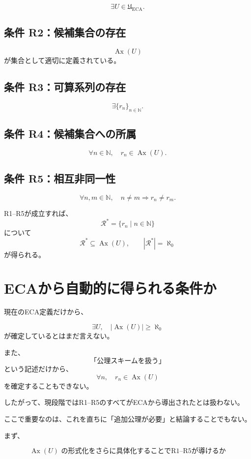 \documentclass[a4paper,11pt]{ltjsarticle}
\begin{document}
\[
\exists U\in\mathfrak U_{\mathrm{ECA}}.
\]

\subsection*{条件 R2：候補集合の存在}

\[
\operatorname{Ax}(U)
\]
が集合として適切に定義されている。

\subsection*{条件 R3：可算系列の存在}

\[
\exists\{r_n\}_{n\in\mathbb N}.
\]

\subsection*{条件 R4：候補集合への所属}

\[
\forall n\in\mathbb N,
\quad
r_n\in\operatorname{Ax}(U).
\]

\subsection*{条件 R5：相互非同一性}

\[
\forall n,m\in\mathbb N,
\quad
n\neq m\Rightarrow r_n\neq r_m.
\]

R1--R5が成立すれば、
\[
\mathcal R^*
=
\{r_n\mid n\in\mathbb N\}
\]
について
\[
\boxed{
\mathcal R^*\subseteq\operatorname{Ax}(U),
\qquad
|\mathcal R^*|=\aleph_0
}
\]
が得られる。

\section{ECAから自動的に得られる条件か}

現在のECA定義だけから、

\[
\exists U,\quad
|\operatorname{Ax}(U)|\ge\aleph_0
\]
が確定しているとはまだ言えない。

また、
\[
\text{「公理スキームを扱う」}
\]
という記述だけから、
\[
\forall n,\quad r_n\in\operatorname{Ax}(U)
\]
を確定することもできない。

したがって、現段階ではR1--R5のすべてがECAから導出されたとは扱わない。

ここで重要なのは、これを直ちに「追加公理が必要」と結論することでもない。

まず、

\[
\boxed{
\operatorname{Ax}(U)
\text{ の形式化をさらに具体化することでR1--R5が導けるか}
}
\]
\end{document}
